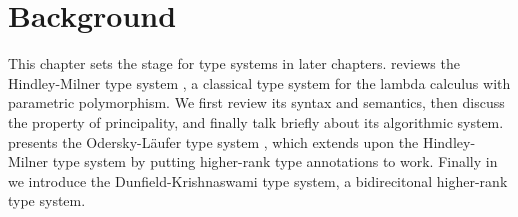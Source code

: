 \chapter{Background}
\label{chap:Background}

This chapter sets the stage for type systems in later chapters. 
reviews the Hindley-Milner type system \citep{Damas:Milner,hindley,milner}, a
classical type system for the lambda calculus with parametric polymorphism. We
first review its syntax and semantics, then discuss the property of
principality, and finally talk briefly about its algorithmic system.
 presents the Odersky-L{\"a}ufer type system
\citep{odersky:putting}, which extends upon the Hindley-Milner type system by
putting higher-rank type annotations to work. Finally in  we
introduce the Dunfield-Krishnaswami type system, a bidirecitonal higher-rank
type system.







